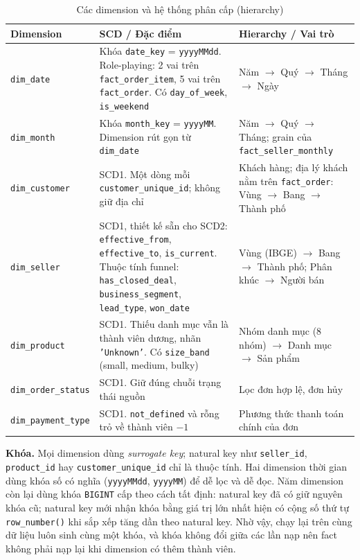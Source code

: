 \documentclass[a4paper]{article}
\begin{document}
\begin{table}[htbp]
\centering
\footnotesize
\setlength{\tabcolsep}{3pt}
\renewcommand{\arraystretch}{1.08}
\caption{Các dimension và hệ thống phân cấp (hierarchy)}
\label{tab:dim_hierarchies}
\begin{tabularx}{\textwidth}{@{}>{\raggedright\arraybackslash}p{2.7cm}>{\raggedright\arraybackslash}X>{\raggedright\arraybackslash}X@{}}
\toprule
\textbf{Dimension} & \textbf{SCD / Đặc điểm} & \textbf{Hierarchy / Vai trò} \\
\midrule
\texttt{dim\_date} & Khóa \texttt{date\_key} = \texttt{yyyyMMdd}. Role-playing: 2 vai trên \texttt{fact\_order\_item}, 5 vai trên \texttt{fact\_order}. Có \texttt{day\_of\_week}, \texttt{is\_weekend} & Năm $\to$ Quý $\to$ Tháng $\to$ Ngày \\
\addlinespace
\texttt{dim\_month} & Khóa \texttt{month\_key} = \texttt{yyyyMM}. Dimension rút gọn từ \texttt{dim\_date} & Năm $\to$ Quý $\to$ Tháng; grain của \texttt{fact\_seller\_monthly} \\
\addlinespace
\texttt{dim\_customer} & SCD1. Một dòng mỗi \texttt{customer\_unique\_id}; không giữ địa chỉ & Khách hàng; địa lý khách nằm trên \texttt{fact\_order}: Vùng $\to$ Bang $\to$ Thành phố \\
\addlinespace
\texttt{dim\_seller} & SCD1, thiết kế sẵn cho SCD2: \texttt{effective\_from}, \texttt{effective\_to}, \texttt{is\_current}. Thuộc tính funnel: \texttt{has\_closed\_deal}, \texttt{business\_segment}, \texttt{lead\_type}, \texttt{won\_date} & Vùng (IBGE) $\to$ Bang $\to$ Thành phố; Phân khúc $\to$ Người bán \\
\addlinespace
\texttt{dim\_product} & SCD1. Thiếu danh mục vẫn là thành viên dương, nhãn \texttt{'Unknown'}. Có \texttt{size\_band} (small, medium, bulky) & Nhóm danh mục (8 nhóm) $\to$ Danh mục $\to$ Sản phẩm \\
\addlinespace
\texttt{dim\_order\_status} & SCD1. Giữ đúng chuỗi trạng thái nguồn & Lọc đơn hợp lệ, đơn hủy \\
\addlinespace
\texttt{dim\_payment\_type} & SCD1. \texttt{not\_defined} và rỗng trỏ về thành viên $-1$ & Phương thức thanh toán chính của đơn \\
\bottomrule
\end{tabularx}
\end{table}

\textbf{Khóa.} Mọi dimension dùng \textit{surrogate key}; natural key như \texttt{seller\_id}, \texttt{product\_id} hay \texttt{customer\_\allowbreak{}unique\_\allowbreak{}id} chỉ là thuộc tính. Hai dimension thời gian dùng khóa số có nghĩa (\texttt{yyyyMMdd}, \texttt{yyyyMM}) để dễ lọc và dễ đọc. Năm dimension còn lại dùng khóa \texttt{BIGINT} cấp theo cách tất định: natural key đã có giữ nguyên khóa cũ; natural key mới nhận khóa bằng giá trị lớn nhất hiện có cộng số thứ tự \texttt{row\_number()} khi sắp xếp tăng dần theo natural key. Nhờ vậy, chạy lại trên cùng dữ liệu luôn sinh cùng một khóa, và khóa không đổi giữa các lần nạp nên fact không phải nạp lại khi dimension có thêm thành viên.
\end{document}
